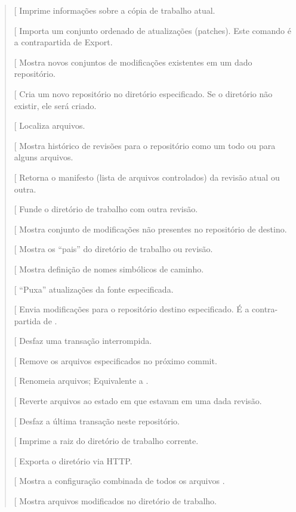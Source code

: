 \documentclass[a4paper,10pt,portuguese]{sphinxmanual}
\begin{document}
\begin{quote}
{[}\code{identify}{]} Imprime informações sobre a cópia de trabalho
atual.

{[}\code{import}{]} Importa um conjunto ordenado de atualizações
(patches). Este comando é a contrapartida de Export.

{[}\code{incoming}{]} Mostra novos conjuntos de modificações existentes em
um dado repositório.

{[}\code{init}{]} Cria um novo repositório no diretório especificado. Se o
diretório não existir, ele será criado.

{[}\code{locate}{]} Localiza arquivos.

{[}\code{log}{]} Mostra histórico de revisões para o repositório como um
todo ou para alguns arquivos.

{[}\code{manifest}{]} Retorna o manifesto (lista de arquivos controlados)
da revisão atual ou outra.

{[}\code{merge}{]} Funde o diretório de trabalho com outra revisão.

{[}\code{outgoing}{]} Mostra conjunto de modificações não presentes no
repositório de destino.

{[}\code{parents}{]} Mostra os ``pais'' do diretório de trabalho ou
revisão.

{[}\code{paths}{]} Mostra definição de nomes simbólicos de caminho.

{[}\code{pull}{]} ``Puxa'' atualizações da fonte especificada.

{[}\code{push}{]} Envia modificações para o repositório destino
especificado. É a contra-partida de .

{[}\code{recover}{]} Desfaz uma transação interrompida.

{[}\code{remove}{]} Remove os arquivos especificados no próximo commit.

{[}\code{rename}{]} Renomeia arquivos; Equivalente a .

{[}\code{revert}{]} Reverte arquivos ao estado em que estavam em uma dada
revisão.

{[}\code{rollback}{]} Desfaz a última transação neste repositório.

{[}\code{root}{]} Imprime a raiz do diretório de trabalho corrente.

{[}\code{serve}{]} Exporta o diretório via HTTP.

{[}\code{showconfig}{]} Mostra a configuração combinada de todos os
arquivos .

{[}\code{status}{]} Mostra arquivos modificados no diretório de trabalho.


\end{quote}
\end{document}
